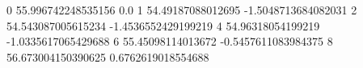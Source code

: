 0 55.996742248535156 0.0
1 54.49187088012695 -1.5048713684082031
2 54.543087005615234 -1.4536552429199219
4 54.96318054199219 -1.0335617065429688
6 55.45098114013672 -0.5457611083984375
8 56.673004150390625 0.6762619018554688

